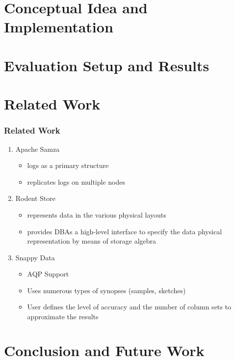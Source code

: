 \documentclass{beamer}
\begin{document}
\section{Conceptual Idea and Implementation}

\section{Evaluation Setup and Results}

\section{Related Work}
\begin{frame}
\frametitle{Related Work}
\begin{enumerate}
\item{Apache Samza}
\begin{itemize}
\item{logs as a primary structure}
\item{replicates logs on multiple nodes}
\end{itemize}
\item{Rodent Store}
\begin{itemize}
\item{represents data in the various physical layouts}
\item{provides DBAs a high-level interface to specify the data physical representation by means of storage algebra}
\end{itemize}
\item{Snappy Data}
\begin{itemize}
\item{AQP Support}
\item{Uses numerous types of synopses (samples, sketches)}
\item{User defines the level of accuracy and the number of column sets to approximate the results}
\end{itemize}
\end{enumerate}
\end{frame}

\section{Conclusion and Future Work}
\end{document}
